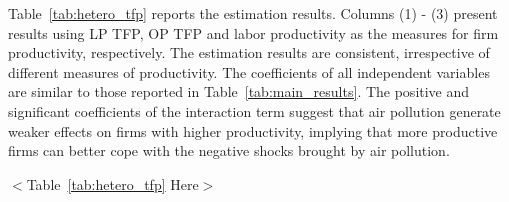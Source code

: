 \documentclass[12pt]{article}
\begin{document}



Table~\ref{tab:hetero_tfp} reports the estimation results. Columns (1) - (3) present results using LP TFP, OP TFP and labor productivity as the measures for firm productivity, respectively. The estimation results are consistent, irrespective of different measures of productivity. The coefficients of all independent variables are similar to those reported in Table~\ref{tab:main_results}. The positive and significant coefficients of the interaction term suggest that air pollution generate weaker effects on firms with higher productivity, implying that more productive firms can better cope with the negative shocks brought by air pollution. 

  \begin{center}
    $<$Table~\ref{tab:hetero_tfp} Here$>$
    \end{center}
\end{document}
